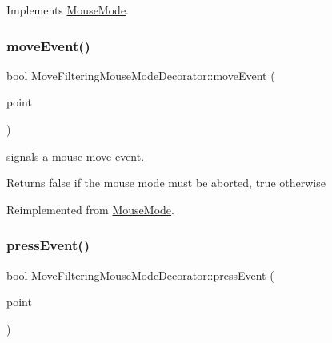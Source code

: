 Implements \mbox{\hyperlink{class_mouse_mode_aa442d3058243efe81e8052a137c2072e}{Mouse\+Mode}}.

\mbox{\label{class_move_filtering_mouse_mode_decorator_a9755a8c9d311a388199be9402d8f5e71}} 
\subsubsection{\texorpdfstring{moveEvent()}{moveEvent()}}
{\footnotesize\ttfamily bool Move\+Filtering\+Mouse\+Mode\+Decorator\+::move\+Event (\begin{DoxyParamCaption}\item[{const Q\+PointF \&}]{point }\end{DoxyParamCaption})\hspace{0.3cm}{\ttfamily [virtual]}}



signals a mouse move event. 

\begin{DoxyReturn}{Returns}
false if the mouse mode must be aborted, true otherwise 
\end{DoxyReturn}


Reimplemented from \mbox{\hyperlink{class_mouse_mode_adb2e2afbb2ac1793a665f1d227e12ce6}{Mouse\+Mode}}.

\mbox{\label{class_move_filtering_mouse_mode_decorator_a78748a2dffb39087c8a5a16859b73615}} 
\subsubsection{\texorpdfstring{pressEvent()}{pressEvent()}}
{\footnotesize\ttfamily bool Move\+Filtering\+Mouse\+Mode\+Decorator\+::press\+Event (\begin{DoxyParamCaption}\item[{const Q\+PointF \&}]{point }\end{DoxyParamCaption})\hspace{0.3cm}{\ttfamily [virtual]}}



